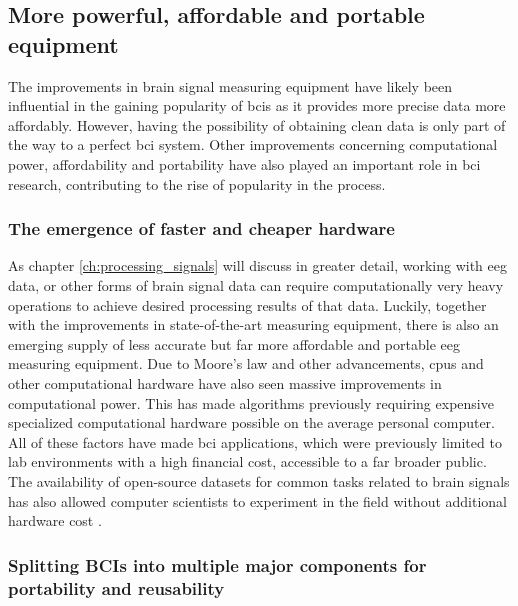 
\subsection{More powerful, affordable and portable equipment}
\label{subsec:bci_gaining_popularity_better_processing}

The improvements in brain signal measuring equipment have likely been influential in the gaining popularity of \glspl{bci} as it provides more precise data more affordably.
However, having the possibility of obtaining clean data is only part of the way to a perfect \gls{bci} system.
Other improvements concerning computational power, affordability and portability have also played an important role in \gls{bci} research, contributing to the rise of popularity in the process.


\subsubsection{The emergence of faster and cheaper hardware}
\label{subsubsec:bci_gaining_popularity_better_processing_cheaper}

As chapter \ref{ch:processing_signals} will discuss in greater detail, working with \gls{eeg} data, or other forms of brain signal data can require computationally very heavy operations to achieve desired processing results of that data.
Luckily, together with the improvements in state-of-the-art measuring equipment, there is also an emerging supply of less accurate but far more affordable and portable \gls{eeg} measuring equipment.
Due to Moore's law \citep{moores_law} and other advancements, \glspl{cpu} and other computational hardware have also seen massive improvements in computational power.
This has made algorithms previously requiring expensive specialized computational hardware possible on the average personal computer.
All of these factors have made \gls{bci} applications, which were previously limited to lab environments with a high financial cost, accessible to a far broader public.
The availability of open-source datasets for common tasks related to brain signals has also allowed computer scientists to experiment in the field without additional hardware cost \citep{eeg_data}.


\subsubsection{Splitting BCIs into multiple major components for portability and reusability}
\label{subsubsec:bci_gaining_popularity_better_processing_split_into_components}

